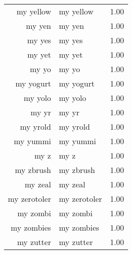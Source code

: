\begin{table}[ht]
\begin{tabular}{rlr}
  my yellow & my yellow & 1.00 \\ 
  my yen & my yen & 1.00 \\ 
  my yes & my yes & 1.00 \\ 
  my yet & my yet & 1.00 \\ 
  my yo & my yo & 1.00 \\ 
  my yogurt & my yogurt & 1.00 \\ 
  my yolo & my yolo & 1.00 \\ 
  my yr & my yr & 1.00 \\ 
  my yrold & my yrold & 1.00 \\ 
  my yummi & my yummi & 1.00 \\ 
  my z & my z & 1.00 \\ 
  my zbrush & my zbrush & 1.00 \\ 
  my zeal & my zeal & 1.00 \\ 
  my zerotoler & my zerotoler & 1.00 \\ 
  my zombi & my zombi & 1.00 \\ 
  my zombies & my zombies & 1.00 \\ 
  my zutter & my zutter & 1.00 \\ 
   \hline
\end{tabular}
\end{table}
